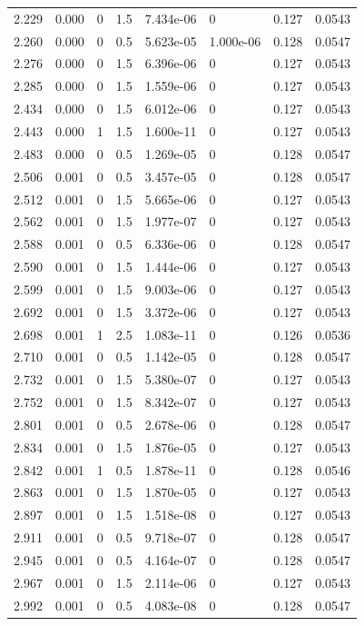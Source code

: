 \documentclass[preview]{standalone}
\begin{document}
{{{\begin{tabular}{L{1.2cm}C{1.2cm} C{0.3cm}C{0.5cm} C{1.4cm}C{1.4cm} C{1.4cm}C{1.4cm}}
  2.229  &  0.000  & 0     & 1.5 &  7.434e-06  & 0  & 0.127 &  0.0543   \\ 
  2.260  &  0.000  & 0     & 0.5 &  5.623e-05  & 1.000e-06  & 0.128 &  0.0547   \\ 
  2.276  &  0.000  & 0     & 1.5 &  6.396e-06  & 0  & 0.127 &  0.0543   \\ 
  2.285  &  0.000  & 0     & 1.5 &  1.559e-06  & 0  & 0.127 &  0.0543   \\ 
  2.434  &  0.000  & 0     & 1.5 &  6.012e-06  & 0  & 0.127 &  0.0543   \\ 
  2.443  &  0.000  & 1     & 1.5 &  1.600e-11  & 0  & 0.127 &  0.0543   \\ 
  2.483  &  0.000  & 0     & 0.5 &  1.269e-05  & 0  & 0.128 &  0.0547   \\ 
  2.506  &  0.001  & 0     & 0.5 &  3.457e-05  & 0  & 0.128 &  0.0547   \\ 
  2.512  &  0.001  & 0     & 1.5 &  5.665e-06  & 0  & 0.127 &  0.0543   \\ 
  2.562  &  0.001  & 0     & 1.5 &  1.977e-07  & 0  & 0.127 &  0.0543   \\ 
  2.588  &  0.001  & 0     & 0.5 &  6.336e-06  & 0  & 0.128 &  0.0547   \\ 
  2.590  &  0.001  & 0     & 1.5 &  1.444e-06  & 0  & 0.127 &  0.0543   \\ 
  2.599  &  0.001  & 0     & 1.5 &  9.003e-06  & 0  & 0.127 &  0.0543   \\ 
  2.692  &  0.001  & 0     & 1.5 &  3.372e-06  & 0  & 0.127 &  0.0543   \\ 
  2.698  &  0.001  & 1     & 2.5 &  1.083e-11  & 0  & 0.126 &  0.0536   \\ 
  2.710  &  0.001  & 0     & 0.5 &  1.142e-05  & 0  & 0.128 &  0.0547   \\ 
  2.732  &  0.001  & 0     & 1.5 &  5.380e-07  & 0  & 0.127 &  0.0543   \\ 
  2.752  &  0.001  & 0     & 1.5 &  8.342e-07  & 0  & 0.127 &  0.0543   \\ 
  2.801  &  0.001  & 0     & 0.5 &  2.678e-06  & 0  & 0.128 &  0.0547   \\ 
  2.834  &  0.001  & 0     & 1.5 &  1.876e-05  & 0  & 0.127 &  0.0543   \\ 
  2.842  &  0.001  & 1     & 0.5 &  1.878e-11  & 0  & 0.128 &  0.0546   \\ 
  2.863  &  0.001  & 0     & 1.5 &  1.870e-05  & 0  & 0.127 &  0.0543   \\ 
  2.897  &  0.001  & 0     & 1.5 &  1.518e-08  & 0  & 0.127 &  0.0543   \\ 
  2.911  &  0.001  & 0     & 0.5 &  9.718e-07  & 0  & 0.128 &  0.0547   \\ 
  2.945  &  0.001  & 0     & 0.5 &  4.164e-07  & 0  & 0.128 &  0.0547   \\ 
  2.967  &  0.001  & 0     & 1.5 &  2.114e-06  & 0  & 0.127 &  0.0543   \\ 
  2.992  &  0.001  & 0     & 0.5 &  4.083e-08  & 0  & 0.128 &  0.0547   \\ 
\hline 
\end{tabular} 

}}}
\end{document}
